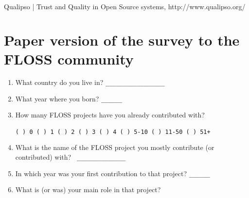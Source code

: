 \documentclass[lnbip]{svmultln}
\begin{document}
\begin{thebibliography}{5}


 Qualipso | Trust and Quality in Open Source
  systems, http://www.qualipso.org/
\end{thebibliography}

\appendix
\section{Paper version of the survey to the FLOSS community}
\label{appendix:a}

\begin{enumerate}
\item What country do you live in? \verb=_________________=
  \vspace{10pt}

\item What year where you born? \verb=______= \vspace{10pt}

\item How many FLOSS projects have you already contributed with?

  \verb=( ) 0 ( ) 1 ( ) 2 ( ) 3 ( ) 4 ( ) 5-10 ( ) 11-50 ( ) 51+=
  \vspace{10pt}

\item What is the name of the FLOSS project you mostly contribute (or
  contributed) with? \verb= ______________= \vspace{10pt}

\item In which year was your first contribution to that project?
  \verb=______= \vspace{10pt}

\item What is (or was) your main role in that project?
  \vspace{10pt}


\end{enumerate}
\end{document}
